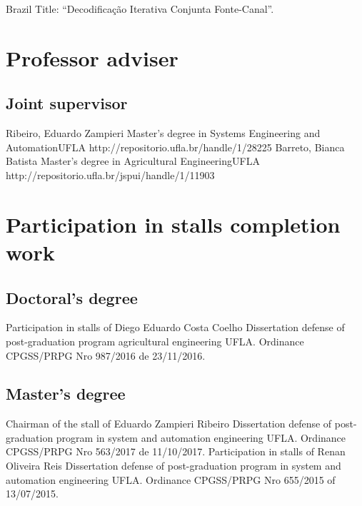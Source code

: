 \documentclass[11pt,a4paper,sans]{moderncv} %
\begin{document}
	      {Brazil}{}{}
	      {Title: ``Decodificação Iterativa Conjunta Fonte-Canal''.}



	       
\section{Professor adviser}
\subsection{Joint supervisor}
			{Ribeiro, Eduardo Zampieri}
			{Master's degree in Systems Engineering and Automation}{UFLA}
			{http://repositorio.ufla.br/handle/1/28225}
			{Barreto, Bianca Batista}
			{Master's degree in Agricultural Engineering}{UFLA}
			{http://repositorio.ufla.br/jspui/handle/1/11903}


\section{Participation in stalls completion work}

\subsection{Doctoral's degree}
			{Participation in stalls of Diego Eduardo Costa Coelho}
			{Dissertation defense of post-graduation program agricultural engineering}{}
			{UFLA. Ordinance CPGSS/PRPG Nro 987/2016 de 23/11/2016.}
			
\subsection{Master's degree}
			{Chairman of the stall of Eduardo Zampieri Ribeiro}
			{Dissertation defense of post-graduation program  in system and automation engineering }{}
			{UFLA. Ordinance CPGSS/PRPG Nro 563/2017 de 11/10/2017.}
			{Participation in stalls of Renan Oliveira Reis}
			{Dissertation defense of post-graduation program  in system and automation engineering }{}
			{UFLA. Ordinance CPGSS/PRPG Nro 655/2015 of 13/07/2015.}
\end{document}
